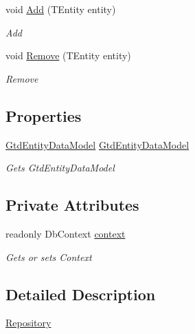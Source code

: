 \begin{DoxyCompactItemize}
void \mbox{\hyperlink{class_gtd_app_1_1_repository_1_1_repository_ad39a0d4a4e385b554881f0195d8b9c3e}{Add}} (T\+Entity entity)
\begin{DoxyCompactList}\small\item\em Add \end{DoxyCompactList}\item 
void \mbox{\hyperlink{class_gtd_app_1_1_repository_1_1_repository_a8a1208608bc26394b65892edc3a79fa4}{Remove}} (T\+Entity entity)
\begin{DoxyCompactList}\small\item\em Remove \end{DoxyCompactList}\end{DoxyCompactItemize}
\subsection*{Properties}
\begin{DoxyCompactItemize}
\item 
\mbox{\hyperlink{class_gtd_app_1_1_data_1_1_gtd_entity_data_model}{Gtd\+Entity\+Data\+Model}} \mbox{\hyperlink{class_gtd_app_1_1_repository_1_1_repository_a26a12cb4c9e45c29c377f4ea76a78b68}{Gtd\+Entity\+Data\+Model}}
\begin{DoxyCompactList}\small\item\em Gets Gtd\+Entity\+Data\+Model \end{DoxyCompactList}\end{DoxyCompactItemize}
\subsection*{Private Attributes}
\begin{DoxyCompactItemize}
\item 
readonly Db\+Context \mbox{\hyperlink{class_gtd_app_1_1_repository_1_1_repository_a693057a1b8acd4c3778c183440feed41}{context}}
\begin{DoxyCompactList}\small\item\em Gets or sets Context \end{DoxyCompactList}\end{DoxyCompactItemize}


\subsection{Detailed Description}
\mbox{\hyperlink{class_gtd_app_1_1_repository_1_1_repository}{Repository}} 


